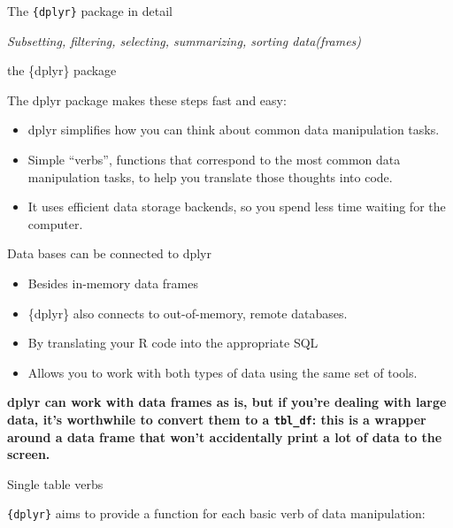 \documentclass[ignorenonframetext,]{beamer}
\providecommand{\tightlist}{%
  \setlength{\itemsep}{0pt}\setlength{\parskip}{0pt}}
\begin{document}
\begin{frame}[fragile]{The \texttt{\{dplyr\}} package in detail}
\protect\hypertarget{the-dplyr-package-in-detail}{}

\emph{Subsetting, filtering, selecting, summarizing, sorting
data(frames)}

\begin{block}{the \{dplyr\} package}

The dplyr package makes these steps fast and easy:

\begin{itemize}
\tightlist
\item
  dplyr simplifies how you can think about common data manipulation
  tasks.
\item
  Simple ``verbs'', functions that correspond to the most common data
  manipulation tasks, to help you translate those thoughts into code.
\item
  It uses efficient data storage backends, so you spend less time
  waiting for the computer.
\end{itemize}

\end{block}

\begin{block}{Data bases can be connected to dplyr}

\begin{itemize}
\tightlist
\item
  Besides in-memory data frames
\item
  \{dplyr\} also connects to out-of-memory, remote databases.
\item
  By translating your R code into the appropriate SQL
\item
  Allows you to work with both types of data using the same set of
  tools.
\end{itemize}

\textbf{dplyr can work with data frames as is, but if you're dealing
with large data, it's worthwhile to convert them to a \texttt{tbl\_df}:
this is a wrapper around a data frame that won't accidentally print a
lot of data to the screen.}

\end{block}

\begin{block}{Single table verbs}

\texttt{\{dplyr\}} aims to provide a function for each basic verb of
data manipulation:


\end{block}
\end{frame}
\end{document}
